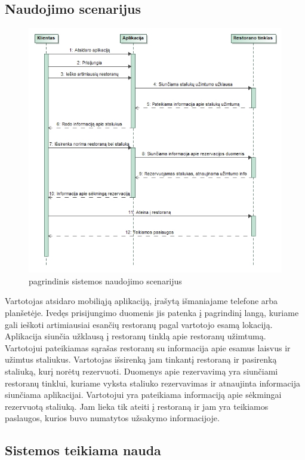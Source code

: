 \documentclass{VUMIFPSkursinis}
\begin{document}
\subsection{Naudojimo scenarijus}
	\begin {figure}[H]
	\centering	
		\caption{pagrindinis sistemos naudojimo scenarijus}
		\includegraphics[scale=0.7]{img/3lab/MainCase.jpg}
		
		\label{fig:maincase}
	\end{figure}
Vartotojas atsidaro mobiliąją aplikaciją, įrašytą išmaniajame telefone arba planšetėje. Ivedęs prisijungimo duomenis jis patenka į pagrindinį langą, kuriame gali ieškoti artimiausiai esančių restoranų pagal vartotojo esamą lokaciją. Aplikacija siunčia užklausą į restoranų tinklą apie restoranų užimtumą. Vartotojui pateikiamas sąrašas restoranų su informacija apie esamus laisvus ir užimtus staliukus. Vartotojas išsirenką jam tinkantį restoraną ir pasirenką staliuką, kurį norėtų rezervuoti. Duomenys apie rezervavimą yra siunčiami restoranų tinklui, kuriame vyksta staliuko rezervavimas ir atnaujinta informacija siunčiama aplikacijai. Vartotojui yra pateikiama informaciją apie sėkmingai rezervuotą staliuką. Jam lieka tik ateiti į restoraną ir jam yra teikiamos paslaugos, kurios buvo numatytos užsakymo informacijoje.

\subsection{Sistemos teikiama nauda}
\end{document}
